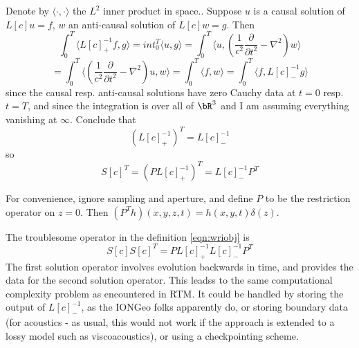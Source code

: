 Denote by $\langle \cdot,\cdot \rangle$ the $L^2$ inner product in space.. Suppose $u$ is a causal solution of $L[c]u=f$, $w$ an anti-causal solution of $L[c]w=g$. Then 
\[
\int_0^T \langle L[c]^{-1}_+f, g \rangle = int_0^T \langle u, g \rangle = \int_0^T \langle u, \left( \frac{1}{c^2}\frac{\partial}{\partial t^2} - \nabla^2\right)w\rangle
\]
\[
= \int_0^T \langle \left( \frac{1}{c^2}\frac{\partial}{\partial t^2} - \nabla^2\right)u, w \rangle = \int_0^T \langle f, w \rangle = \int_0^T \langle f, L[c]^{-1}_-g \rangle
\]
since the causal resp. anti-causal solutions have zero Cauchy data at $t=0$ resp. $t=T$, and since the integration is over all of $\bR^3$ and I am assuming everything vanishing at $\infty$. Conclude that
\[
(L[c]^{-1}_+)^T = L[c]^{-1}_-
\]
so
\[
S[c]^T = (PL[c]^{-1}_+)^T = L[c]^{-1}_-P^T
\]

For convenience, ignore sampling and aperture, and define $P$ to be the restriction operator on $z=0$. Then $(P^T h)(x,y,z,t) = h(x,y,t)\delta(z)$.

The troublesome operator in the definition \ref{eqn:wriobj} is 
\[
S[c]S[c]^T = PL[c]^{-1}_+L[c]^{-1}_-P^T
\]
The first solution operator involves evolution backwards in time, and provides the data for the second solution operator. This leadss to the same computational complexity problem as encountered in RTM. It could be handled by storing the output of $L[c]^{-1}_-$, as the IONGeo folks apparently do, or storing boundary data (for acoustics - as usual, this would not work if the approach is extended to a lossy model such as viscoacoustics), or using a checkpointing scheme.

